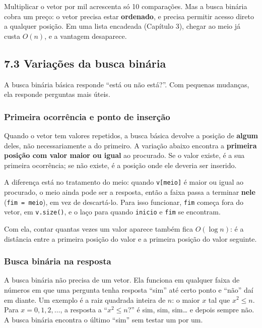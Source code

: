 Multiplicar o vetor por mil acrescenta só 10 comparações. Mas a busca binária cobra um preço: o vetor precisa estar \textbf{ordenado}, e precisa permitir acesso direto a qualquer posição. Em uma lista encadeada (Capítulo 3), chegar ao meio já custa $O(n)$, e a vantagem desaparece.

\subsection{7.3 Variações da busca binária}

A busca binária básica responde ``está ou não está?''. Com pequenas mudanças, ela responde perguntas mais úteis.

\subsubsection{Primeira ocorrência e ponto de inserção}

Quando o vetor tem valores repetidos, a busca básica devolve a posição de \textbf{algum} deles, não necessariamente a do primeiro. A variação abaixo encontra a \textbf{primeira posição com valor maior ou igual} ao procurado. Se o valor existe, é a sua primeira ocorrência; se não existe, é a posição onde ele deveria ser inserido.

A diferença está no tratamento do meio: quando \texttt{v[meio]} é maior ou igual ao procurado, o meio ainda pode ser a resposta, então a faixa passa a terminar \textbf{nele} (\texttt{fim = meio}), em vez de descartá-lo. Para isso funcionar, \texttt{fim} começa fora do vetor, em \texttt{v.size()}, e o laço para quando \texttt{inicio} e \texttt{fim} se encontram.

Com ela, contar quantas vezes um valor aparece também fica $O(\log n)$: é a distância entre a primeira posição do valor e a primeira posição do valor seguinte.

\subsubsection{Busca binária na resposta}

A busca binária não precisa de um vetor. Ela funciona em qualquer faixa de números em que uma pergunta tenha resposta ``sim'' até certo ponto e ``não'' daí em diante. Um exemplo é a raiz quadrada inteira de $n$: o maior $x$ tal que $x^2 \le n$. Para $x = 0, 1, 2, \ldots$, a resposta a ``$x^2 \le n$?'' é sim, sim, sim\ldots{} e depois sempre não. A busca binária encontra o último ``sim'' sem testar um por um.


